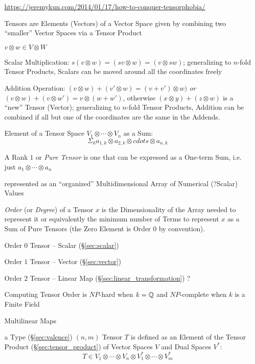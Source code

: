 \fist
\url{https://jeremykun.com/2014/01/17/how-to-conquer-tensorphobia/}

Tensors are Elements (Vectors) of a Vector Space given by
combining two ``smaller'' Vector Spaces via a Tensor Product

$v \otimes w \in V \otimes W$

Scalar Multiplication: $s(v \otimes w) = (sv \otimes w) = (v \otimes
sw)$; generalizing to  $n$-fold Tensor Products, Scalars can be moved
around all the coordinates freely

Addition Operation: $(v \otimes w) + (v' \otimes w) = (v + v') \otimes
w)$ \emph{or} $(v \otimes w) + (v \otimes w') = v \otimes (w + w')$,
otherwise $(x \otimes y) + (z \otimes w)$ is a ``new'' Tensor
(Vector); generalizing to $n$-fold Tensor Products, Addition can be
combined if all but one of the coordinates are the same in the
Addends.

Element of a Tensor Space $V_1 \otimes \cdots \otimes V_n$ as a Sum:
\[
  \Sigma_k a_{1,k} \otimes a_{2,k} \otimes cdots \otimes a_{n,k}
\]

A Rank $1$ or \emph{Pure Tensor} is one that can be expressed as a
One-term Sum, i.e. just $a_1 \otimes \cdots \otimes a_n$


\asterism


represented as an ``organized'' Multidimensional Array of Numerical
(?Scalar) Values

\emph{Order} (or \emph{Degree}) of a Tensor $x$ is the
Dimensionality of the Array needed to represent it or equivalently the
minimum number of Terms to represent $x$ as a Sum of Pure Tensors (the
Zero Element is Order $0$ by convention).

Order $0$ Tensor -- Scalar (\S\ref{sec:scalar})

Order $1$ Tensor -- Vector (\S\ref{sec:vector})

Order $2$ Tensor -- Linear Map (\S\ref{sec:linear_transformation}) ?

Computing Tensor Order is $NP$-hard when $k = \mathbb{Q}$ and $NP$-complete
when $k$ is a Finite Field %


\asterism


Multilinear Maps


\asterism


a Type (\S\ref{sec:valence}) $(n,m)$ Tensor $T$ is defined as an
Element of the Tensor Product (\S\ref{sec:tensor_product}) of Vector
Spaces $V$ and Dual Spaces $V^*$:
\[
  T \in V_1 \otimes \cdots \otimes V_n
    \otimes V^*_1 \otimes \cdots \otimes V^*_m
\]

